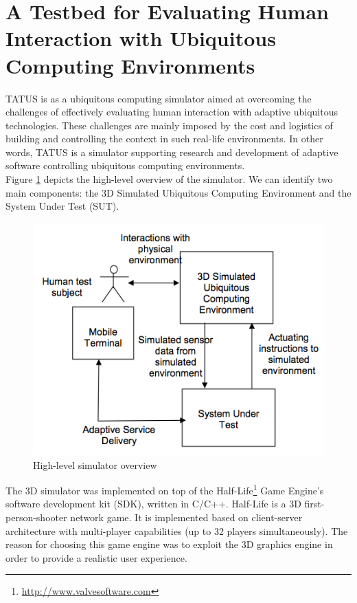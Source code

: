 \section{A Testbed for Evaluating Human Interaction with Ubiquitous Computing Environments}\label{sec:tatus}

TATUS \cite{o2005testbed} is as a ubiquitous computing simulator aimed at overcoming the challenges of effectively evaluating human interaction with adaptive ubiquitous technologies. These challenges are mainly imposed by the cost and logistics of building and controlling the context in such real-life environments. In other words, TATUS is a simulator supporting research and development of adaptive software controlling ubiquitous computing environments.\\

Figure \ref{fig:tatus_overview} depicts the high-level overview of the simulator. We can identify two main components: the 3D Simulated Ubiquitous Computing Environment and the System Under Test (SUT).\\

\begin{figure}[H]
	\centering
	\includegraphics[width=\linewidth]{gfx/Chapter2/tatus_system_overview}
	\caption{High-level simulator overview}
	\label{fig:tatus_overview}
\end{figure}

The 3D simulator was implemented on top of the Half-Life\footnote{\url{http://www.valvesoftware.com}} Game Engine's software development kit (SDK), written in C/C++. Half-Life is a 3D first-person-shooter network game. It is implemented based on client-server architecture with multi-player capabilities (up to 32 players simultaneously). The reason for choosing this game engine was to exploit the 3D graphics engine in order to provide a realistic user experience.\\

